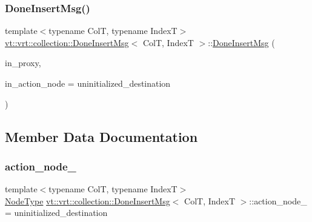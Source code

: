 \subsubsection{\texorpdfstring{Done\+Insert\+Msg()}{DoneInsertMsg()}\hspace{0.1cm}{\footnotesize\ttfamily [2/2]}}
{\footnotesize\ttfamily template$<$typename ColT, typename IndexT$>$ \\
\hyperlink{structvt_1_1vrt_1_1collection_1_1_done_insert_msg}{vt\+::vrt\+::collection\+::\+Done\+Insert\+Msg}$<$ ColT, IndexT $>$\+::\hyperlink{structvt_1_1vrt_1_1collection_1_1_done_insert_msg}{Done\+Insert\+Msg} (\begin{DoxyParamCaption}\item[{\hyperlink{structvt_1_1vrt_1_1collection_1_1_collection_proxy}{Collection\+Proxy}$<$ ColT, IndexT $>$}]{in\+\_\+proxy,  }\item[{\hyperlink{namespacevt_a866da9d0efc19c0a1ce79e9e492f47e2}{Node\+Type} const \&}]{in\+\_\+action\+\_\+node = {\ttfamily uninitialized\+\_\+destination} }\end{DoxyParamCaption})\hspace{0.3cm}{\ttfamily [inline]}}



\subsection{Member Data Documentation}
\mbox{\label{structvt_1_1vrt_1_1collection_1_1_done_insert_msg_a73c8173c2b8170bfd6be91491d79a0ae}} 
\subsubsection{\texorpdfstring{action\+\_\+node\+\_\+}{action\_node\_}}
{\footnotesize\ttfamily template$<$typename ColT, typename IndexT$>$ \\
\hyperlink{namespacevt_a866da9d0efc19c0a1ce79e9e492f47e2}{Node\+Type} \hyperlink{structvt_1_1vrt_1_1collection_1_1_done_insert_msg}{vt\+::vrt\+::collection\+::\+Done\+Insert\+Msg}$<$ ColT, IndexT $>$\+::action\+\_\+node\+\_\+ = uninitialized\+\_\+destination}

